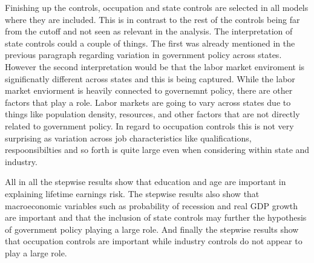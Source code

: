 \documentclass[12pt]{article}
\begin{document}
\begin{onehalfspace}
Finishing up the controls, occupation and state controls are selected in all models where they are included. This is in contrast to the rest of the controls being far from the cutoff and not seen as relevant in the analysis. The interpretation of state controls could a couple of things. The first was already mentioned in the previous paragraph regarding variation in government policy across states. However the second interpretation would be that the labor market enviroment is significnatly different across states and this is being captured. While the labor market enviorment is heavily connected to governemnt policy, there are other factors that play a role. Labor markets are going to vary across states due to things like population density, resources, and other factors that are not directly related to government policy. In regard to occupation controls this is not very surprising as variation across job characteristics like qualifications, respoonsibilties and so forth is quite large even when considering within state and industry.

All in all the stepwise results show that education and age are important in explaining lifetime earnings risk. The stepwise results also show that macroeconomic variables such as probability of recession and real GDP growth are important and that the inclusion of state controls may further the hypothesis of government policy playing a large role. And finally the stepwise results show that occupation controls are important while industry controls do not appear to play a large role.


\end{onehalfspace}
\end{document}

